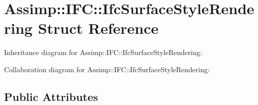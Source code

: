 \hypertarget{struct_assimp_1_1_i_f_c_1_1_ifc_surface_style_rendering}{\section{Assimp\+:\+:I\+F\+C\+:\+:Ifc\+Surface\+Style\+Rendering Struct Reference}
\label{struct_assimp_1_1_i_f_c_1_1_ifc_surface_style_rendering}
}


Inheritance diagram for Assimp\+:\+:I\+F\+C\+:\+:Ifc\+Surface\+Style\+Rendering\+:


Collaboration diagram for Assimp\+:\+:I\+F\+C\+:\+:Ifc\+Surface\+Style\+Rendering\+:
\subsection*{Public Attributes}

